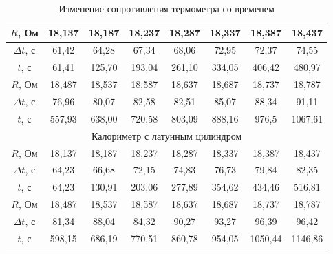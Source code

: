 \documentclass[a4paper,12pt]{article} %
\begin{document}
\begin{table}[]
\begin{tabular}{|c|c|c|c|c|c|c|c|}
        $R$, Ом & 18,137 & 18,187 & 18,237 & 18,287 & 18,337 & 18,387 & 18,437 \\ \hline
        $\Delta t$, с & 61,42 & 64,28 & 67,34 & 68,06 & 72,95 & 72,37 & 74,55 \\ \hline
        $t$, с & 61,41 & 125,70 & 193,04 & 261,10 & 334,05 & 406,42 & 480,97 \\ \hline
        $R$, Ом & 18,487 & 18,537 & 18,587 & 18,637 & 18,687 & 18,737 & 18,787 \\ \hline
        $\Delta t$, с & 76,96 & 80,07 & 82,58 & 82,51 & 85,07 & 88,34 & 91,11 \\ \hline
        $t$, с & 557,93 & 638,00 & 720,58 & 803,09 & 888,16 & 976,5 & 1067,61 \\ \hline
        \multicolumn{8}{|c|}{Калориметр с латунным цилиндром}\\ \hline
        $R$, Ом & 18,137 & 18,187 & 18,237 & 18,287 & 18,337 & 18,387 & 18,437\\ \hline
        $\Delta t$, с & 64,23 & 66,68 & 72,15 & 74,83 & 76,73 & 79,84 & 82,35\\ \hline
        $t$, с & 64,23 & 130,91 & 203,06 & 277,89 & 354,62 & 434,46 & 516,81\\ \hline
        $R$, Ом & 18,487 & 18,537 & 18,587 & 18,637 & 18,687 & 18,737 & 18,787\\ \hline
        $\Delta t$, с & 81,34 & 88,04 & 84,32 & 90,27 & 93,27 & 96,39 & 96,42\\ \hline
        $t$, с & 598,15 & 686,19 & 770,51 & 860,78 & 954,05 & 1050,44 & 1146,86\\ \hline
        \end{tabular}
    \caption{Изменение сопротивления термометра со временем}
    \label{tab:resistances}
\end{table}
\end{document}
